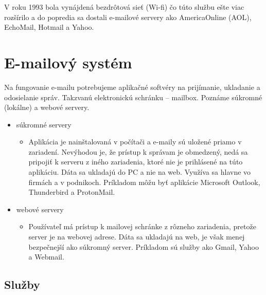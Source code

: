 \documentclass[10pt,twoside,slovak,a4paper]{article}
\begin{document}
\hspace{0.5cm}V roku 1993 bola vynájdená bezdrôtová sieť (Wi-fi) čo túto službu ešte viac rozšírilo a do popredia sa dostali e-mailové servery ako AmericaOnline (AOL), EchoMail, Hotmail a Yahoo.\cite{UPI, Phrasee, Kleinrock}

\section{E-mailový systém} 

Na fungovanie e-mailu potrebujeme aplikačné softvéry na prijímanie, ukladanie a odosielanie správ. Takzvanú elektronickú schránku – mailbox. Poznáme súkromné (lokálne)  a webové servery. 

\begin{itemize}
\item súkromné servery
   \begin{itemize}
	\item Aplikácia je nainštalovaná v počítači a e-maily sú uložené priamo v zariadení. Nevýhodou je, že prístup k správam je obmedzený, nedá sa pripojiť k serveru z iného zariadenia, ktoré nie je prihlásené na túto aplikáciu. Dáta sa ukladajú do PC a nie na web. Využíva sa hlavne vo firmách a v podnikoch. Príkladom môžu byť aplikácie Microsoft Outlook, Thunderbird a ProtonMail. 
	\end{itemize}
\item webové servery
	\begin{itemize}
	\item Používateľ má prístup k mailovej schránke z rôzneho zariadenia, pretože server je na webovej adrese. Dáta sa ukladajú na web, je však menej bezpečnejší ako súkromný server. Príkladom sú služby ako Gmail, Yahoo a Webmail.
	\end{itemize}
\end{itemize}

\cite{GORALSKI}

\subsection{Služby} 
\end{document}
